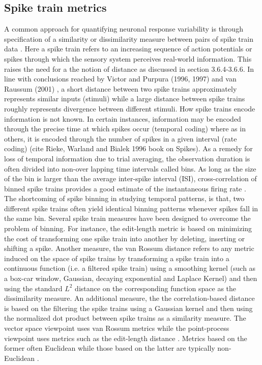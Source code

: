 \subsection{Spike train metrics}
A common approach for quantifying neuronal response variability is through specification of a  similarity or dissimilarity measure between pairs of spike train data \cite{Brown2004, Victor1996, Victor1998,Rossum2001,houghton2010measuring, Schreiber2003}.
Here a spike train refers to an increasing sequence of action potentials or spikes through which the sensory system perceives real-world information.
This raises the need for a the notion of distance as discussed in section 3.6.4-3.6.6.  In line with conclusions reached by Victor and Purpura (1996, 1997) and van Raussum (2001) \cite{Victor1996, Victor1998, Rossum2001}, a short distance between two spike trains approximately represents similar inputs (stimuli) while a large distance between spike trains roughly represents divergence between different stimuli.
How spike trains encode information is not known. In certain instances, information may be encoded through the precise time at which spikes occur (temporal coding) where as in others, it is encoded through the number of spikes in a given interval (rate coding) (cite Rieke, Warland and Bialek 1996 book on Spikes).
As a remedy for loss of temporal information due to trial averaging, the observation duration is often divided into non-over lapping time intervals called bins. As long as the size of the bin is larger than the average inter-spike interval (ISI), cross-correlation of binned spike trains provides a good estimate of the instantaneous firing rate \cite{Brown2004}. The shortcoming of spike binning in studying temporal patterns, is that, two different spike trains often yield identical binning patterns whenever spikes fall in the same bin. Several spike train measures have been designed to overcome the problem of binning. For instance, the edit-length metric \cite{Victor1996, Victor1998} is based on minimizing the cost of transforming one spike train into another by deleting, inserting or shifting a spike. Another measure, the van Rossum distance \cite{Rossum2001, houghton2010measuring} refers to any metric induced on the space of spike trains by transforming a spike train into a continuous function (i.e. a filtered spike train) using a smoothing kernel (such as a box-car window, Gaussian, decaying exponential and  Laplace Kernel) and then using the standard $L^2$ distance on the corresponding function space as the dissimilarity measure. An additional measure, the the correlation-based distance \cite{Schreiber2003} is based on the filtering the spike trains using a Gaussian kernel and then using the normalized dot product between  spike trains as a  similarity measure.
The vector space viewpoint uses van Rossum metrics while the point-process viewpoint uses metrics such as the edit-length distance \cite{Victor2005}. 
Metrics based on the former often Euclidean while those based on the latter are typically non-Euclidean \cite{Aronov2004}.\\


